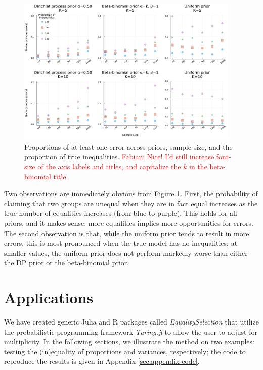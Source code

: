 \documentclass[11pt,a4paper]{article}
\theoremstyle{definition} %
\theoremstyle{case}
\newcommand{\FD}[1]{\textcolor{red}{Fabian: #1 }}
\begin{document}
\begin{figure}
    \centering
    \includegraphics[width=0.95\textwidth]{figures/simulation_results_test_clean_figures/simulation_manuscript.pdf}
    \caption{Proportions of at least one error across priors, sample size, and the proportion of true inequalities. \FD{Nice! I'd still increase font-size of the axis labels and titles, and capitalize the $k$ in the beta-binomial title.}}
    \label{fig:big_simulation}
\end{figure}

Two observations are immediately obvious from Figure \ref{fig:big_simulation}. First, the probability of claiming that two groups are unequal when they are in fact equal increases as the true number of equalities increases (from blue to purple). This holds for all priors, and it makes sense: more equalities implies more opportunities for errors. The second observation is that, while the uniform prior tends to result in more errors, this is most pronounced when the true model has no inequalities; at smaller values, the uniform prior does not perform markedly worse than either the DP prior or the beta-binomial prior.

\section{Applications} \label{sec:applications}
We have created generic Julia and R packages called \textit{EqualitySelection} that utilize the probabilistic programming framework \textit{Turing.jl} to allow the user to adjust for multiplicity. In the following sections, we illustrate the method on two examples: testing the (in)equality of proportions and variances, respectively; the code to reproduce the results is given in Appendix \ref{sec:appendix-code}.
\end{document}
